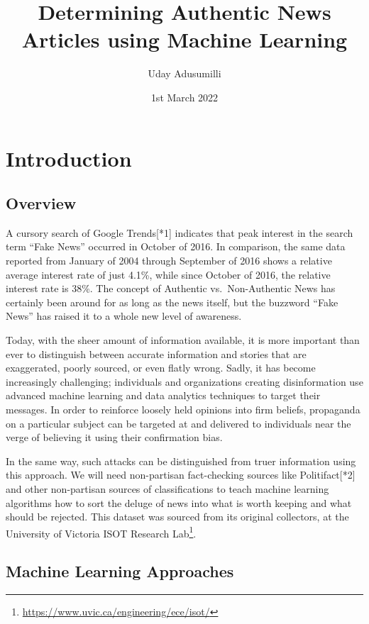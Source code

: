 \documentclass[
]{article}
\title{Determining Authentic News Articles using Machine Learning}
\author{Uday Adusumilli}
\date{1st March 2022}
\begin{document}
\maketitle

\hypertarget{introduction}{%
\section{Introduction}\label{introduction}}

\hypertarget{overview}{%
\subsection{Overview}\label{overview}}

A cursory search of Google Trends{[}*1{]} indicates that peak interest
in the search term ``Fake News'' occurred in October of 2016. In
comparison, the same data reported from January of 2004 through
September of 2016 shows a relative average interest rate of just 4.1\%,
while since October of 2016, the relative interest rate is 38\%. The
concept of Authentic vs.~Non-Authentic News has certainly been around
for as long as the news itself, but the buzzword ``Fake News'' has
raised it to a whole new level of awareness.

Today, with the sheer amount of information available, it is more
important than ever to distinguish between accurate information and
stories that are exaggerated, poorly sourced, or even flatly wrong.
Sadly, it has become increasingly challenging; individuals and
organizations creating disinformation use advanced machine learning and
data analytics techniques to target their messages. In order to
reinforce loosely held opinions into firm beliefs, propaganda on a
particular subject can be targeted at and delivered to individuals near
the verge of believing it using their confirmation bias.

In the same way, such attacks can be distinguished from truer
information using this approach. We will need non-partisan fact-checking
sources like Politifact{[}*2{]} and other non-partisan sources of
classifications to teach machine learning algorithms how to sort the
deluge of news into what is worth keeping and what should be rejected.
This dataset was sourced from its original collectors, at the University
of Victoria ISOT Research Lab\footnote{\url{https://www.uvic.ca/engineering/ece/isot/}}.

\hypertarget{machine-learning-approaches}{%
\subsection{Machine Learning
Approaches}\label{machine-learning-approaches}}
\end{document}
